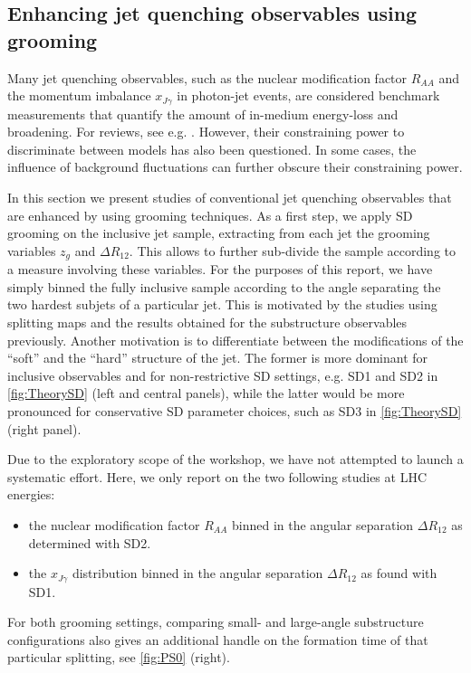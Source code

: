 \subsection{Enhancing jet quenching observables using grooming}
\label{sec:dissecting}

Many jet quenching observables, such as the nuclear modification factor $R_{AA}$ and the momentum imbalance $x_{J\gamma}$ in photon-jet events, are considered benchmark measurements that quantify the amount of in-medium energy-loss and broadening. For reviews, see e.g. \cite{dEnterria:2009xfs,Majumder:2010qh}. However, their constraining power to discriminate between models has also been questioned. In some cases, the influence of background fluctuations can further obscure their constraining power.

In this section we present studies of conventional jet quenching observables that are enhanced by using grooming techniques.  As a first step, we apply SD grooming on the inclusive jet sample, extracting from each jet the grooming variables $z_g$ and $\Delta R_{12}$. 
This allows to further sub-divide the sample according to a measure involving these variables. 
For the purposes of this report, we have simply binned the fully inclusive sample according to the angle separating the two hardest subjets of a particular jet. This is motivated by the studies using splitting maps and the results obtained for the substructure observables previously. Another motivation is to differentiate between the modifications of the ``soft'' and the ``hard'' structure of the jet. The former is more dominant for inclusive observables and for non-restrictive SD settings, e.g. SD1 and SD2 in \autoref{fig:TheorySD} (left and central panels), while the latter would be more pronounced for conservative SD parameter choices, such as SD3 in \autoref{fig:TheorySD} (right panel).

Due to the exploratory scope of the workshop, we have not attempted to launch a systematic effort. Here, we only report on the two following studies at LHC energies:
\begin{itemize} 

\item the nuclear modification factor $R_{AA}$ binned in the angular separation $\Delta R_{12}$ as determined with SD2.

\item the $x_{J\gamma}$ distribution binned in the angular separation $\Delta R_{12}$ as found with SD1. 
\end{itemize}
For both grooming settings, comparing small- and large-angle substructure configurations also gives an additional handle on the formation time of that particular splitting, see \autoref{fig:PS0} (right).

